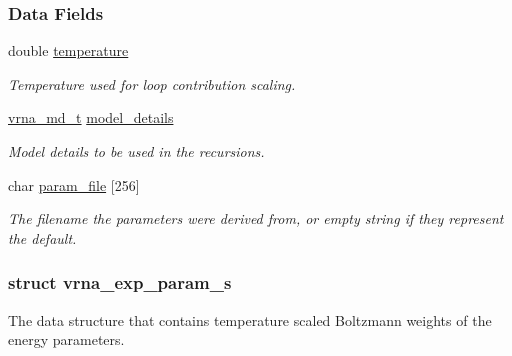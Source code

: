 \subsubsection*{Data Fields}
\begin{DoxyCompactItemize}
\item 
\mbox{\label{group__energy__parameters_aeed2cd83713012bcb52e431041e037c8}} 
double \hyperlink{group__energy__parameters_aeed2cd83713012bcb52e431041e037c8}{temperature}
\begin{DoxyCompactList}\small\item\em Temperature used for loop contribution scaling. \end{DoxyCompactList}\item 
\mbox{\label{group__energy__parameters_a7b84353eb9075c595bad4ceb871bcae7}} 
\hyperlink{group__model__details_ga1f8a10e12a0a1915f2a4eff0b28ea17c}{vrna\+\_\+md\+\_\+t} \hyperlink{group__energy__parameters_a7b84353eb9075c595bad4ceb871bcae7}{model\+\_\+details}
\begin{DoxyCompactList}\small\item\em Model details to be used in the recursions. \end{DoxyCompactList}\item 
\mbox{\label{group__energy__parameters_ace10aa4aacffcbf6de92349f2ee0d66a}} 
char \hyperlink{group__energy__parameters_ace10aa4aacffcbf6de92349f2ee0d66a}{param\+\_\+file} \mbox{[}256\mbox{]}
\begin{DoxyCompactList}\small\item\em The filename the parameters were derived from, or empty string if they represent the default. \end{DoxyCompactList}\end{DoxyCompactItemize}
\label{structvrna__exp__param__s}
\subsubsection{struct vrna\+\_\+exp\+\_\+param\+\_\+s}
The data structure that contains temperature scaled Boltzmann weights of the energy parameters. 

